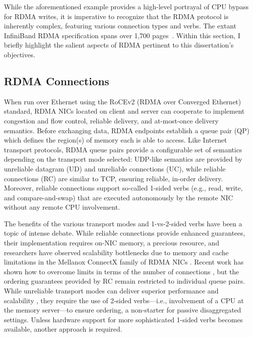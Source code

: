 \documentclass[12pt]{ucsddissertation}
\begin{document}
While the aforementioned example provides a high-level portrayal of CPU bypass for RDMA writes, it
is imperative to recognize that the RDMA protocol is inherently complex, featuring various
connection types and verbs. The extant InfiniBand RDMA specification spans over 1,700
pages~\cite{infiniband-spec}. Within this section, I briefly highlight the salient aspects of RDMA
pertinent to this dissertation's objectives.

\subsection{RDMA Connections}


When run over Ethernet using the RoCEv2 (RDMA over Converged Ethernet) standard, RDMA NICs located
on client and server can cooperate to implement congestion \cite{hpcc,dcqcn} and flow control,
reliable delivery, and at-most-once delivery semantics. Before exchanging data, RDMA endpoints
establish a queue pair (QP) which defines the region(s) of memory each is able to access. Like
Internet transport protocols, RDMA queue pairs provide a configurable set of semantics depending on
the transport mode selected: UDP-like semantics are provided by unreliable datagram (UD) and
unreliable connections (UC), while reliable connections (RC) are similar to TCP, ensuring reliable,
in-order delivery. Moreover, reliable connections support so-called 1-sided verbs (e.g., read,
write, and compare-and-swap) that are executed autonomously by the remote NIC without any remote CPU
involvement.

The benefits of the various transport modes and 1-vs-2-sided verbs have been a topic of intense
debate. While reliable connections provide enhanced guarantees, their implementation requires on-NIC
memory, a precious resource, and researchers have observed scalability bottlenecks due to memory and
cache limitations in the Mellanox ConnectX family of RDMA NICs
\cite{farm,fasst,erpc,lite,design-guidelines}. Recent work has shown how to overcome limits in terms
of the number of connections \cite{storm,flock}, but the ordering guarantees provided by RC remain
restricted to individual queue pairs. While unreliable transport modes can deliver superior
performance and scalability \cite{fasst}, they require the use of 2-sided verbs---i.e., involvement
of a CPU at the memory server---to ensure ordering, a non-starter for passive disaggregated
settings. Unless hardware support for more sophisticated 1-sided verbs \cite{filemr,rma,star}
becomes available, another approach is required.
\end{document}
